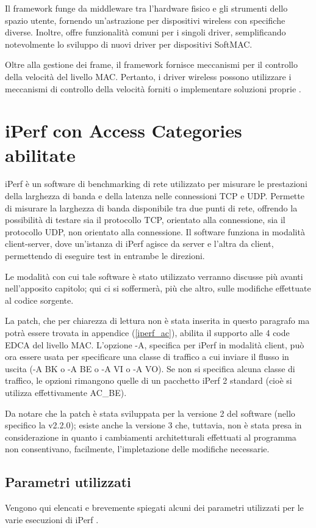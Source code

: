 Il framework funge da middleware tra l'hardware fisico e gli strumenti dello spazio utente, fornendo un'astrazione per dispositivi wireless con specifiche diverse. Inoltre, offre funzionalità comuni per i singoli driver, semplificando notevolmente lo sviluppo di nuovi driver per dispositivi SoftMAC.

Oltre alla gestione dei frame, il framework fornisce meccanismi per il controllo della velocità del livello MAC. Pertanto, i driver wireless possono utilizzare i meccanismi di controllo della velocità forniti o implementare soluzioni proprie \cite{wireless-profiling}.


\section{iPerf con Access Categories abilitate}
iPerf è un software di benchmarking di rete utilizzato per misurare le prestazioni della larghezza di banda e della latenza nelle connessioni TCP e UDP. Permette di misurare la larghezza di banda disponibile tra due punti di rete, offrendo la possibilità di testare sia il protocollo TCP, orientato alla connessione, sia il protocollo UDP, non orientato alla connessione. Il software funziona in modalità client-server, dove un'istanza di iPerf agisce da server e l'altra da client, permettendo di eseguire test in entrambe le direzioni.

Le modalità con cui tale software è stato utilizzato verranno discusse più avanti nell'apposito capitolo; qui ci si soffermerà, più che altro, sulle modifiche effettuate al codice sorgente.

La patch, che per chiarezza di lettura non è stata inserita in questo paragrafo ma potrà essere trovata in appendice (\autoref{iperf_ac}), abilita il supporto alle 4 code EDCA del livello MAC. L'opzione -A, specifica per iPerf in modalità client, può ora essere usata per specificare una classe di traffico a cui inviare il flusso in uscita (-A BK o -A BE o -A VI o -A VO). Se non si specifica alcuna classe di traffico, le opzioni rimangono quelle di un pacchetto iPerf 2 standard (cioè si utilizza effettivamente AC\_BE).

Da notare che la patch è stata sviluppata per la versione 2 del software (nello specifico la v2.2.0); esiste anche la versione 3 che, tuttavia, non è stata presa in considerazione in quanto i cambiamenti architetturali effettuati al programma non consentivano, facilmente, l'impletazione delle modifiche necessarie.

\subsection[Parametri utilizzati]{Parametri utilizzati}
Vengono qui elencati e brevemente spiegati alcuni dei parametri utilizzati per le varie esecuzioni di iPerf \cite{iperf}.

